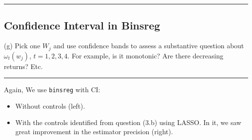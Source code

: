 \documentclass{article}
\newenvironment{colorparagraph}[1]{\par\color{#1}}{\par}
\begin{document}

\begin{colorparagraph}{questioncolor}
\rule{\textwidth}{0.5pt}
\label{q3g}
\subsection{Confidence Interval in Binsreg}
(g) Pick one \( W_j \) and use confidence bands to assess a substantive question about \( \omega_t(w_j) \), \( t = 1, 2, 3, 4 \). For example, is it monotonic? Are there decreasing returns? Etc.

\rule{\textwidth}{0.5pt}
\end{colorparagraph}

Again, We use \texttt{binsreg} with CI:
\begin{itemize}
  \item Without controls (left).
  \item With the controls identified from question (3.b) using LASSO. In it, we saw great improvement in the estimator precision (right).
\end{itemize}
\end{document}
